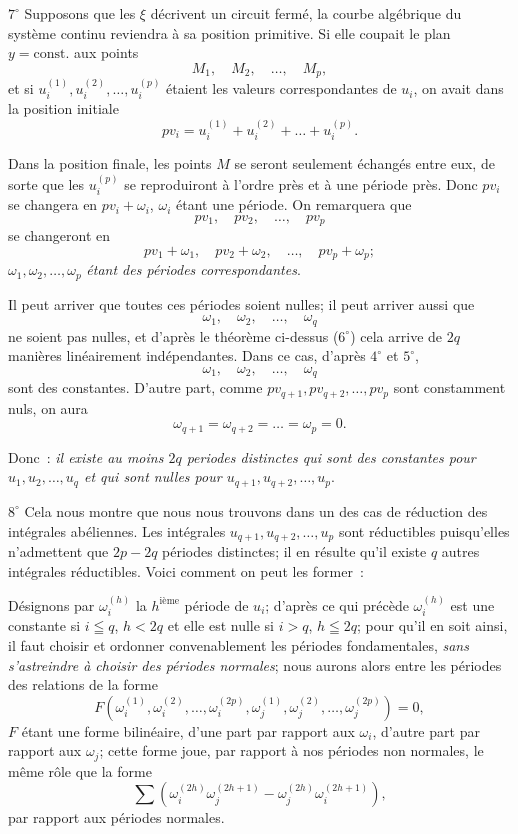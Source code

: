 \documentclass{article}
\begin{document}
$7^\circ$ Supposons que les $\xi$ décrivent un circuit fermé, la courbe algébrique du système continu reviendra à sa position primitive. Si elle coupait le plan $y = \mathrm{const.}$ aux points
\[
M_{1}, \quad M_{2}, \quad \ldots, \quad M_{p},
\]
et si $u_{i}^{(1)}, u_{i}^{(2)}, \ldots, u_{i}^{(p)}$ étaient les valeurs correspondantes de $u_{i}$, on avait dans la position initiale
\[
p v_{i} = u_{i}^{(1)} + u_{i}^{(2)} + \ldots + u_{i}^{(p)}.
\]

Dans la position finale, les points $M$ se seront seulement échangés entre eux, de sorte que les $u_{i}^{(p)}$ se reproduiront à l'ordre près et à une période près. Donc $p v_{i}$ se changera en $p v_{i} + \omega_{i}$, $\omega_{i}$ étant une période. On remarquera que
\[
p v_{1}, \quad p v_{2}, \quad \ldots, \quad p v_{p}
\]
se changeront en
\[
p v_{1} + \omega_{1}, \quad p v_{2} + \omega_{2}, \quad \ldots, \quad p v_{p} + \omega_{p};
\]
$\omega_{1}, \omega_{2}, \ldots, \omega_{p}$ \emph{étant des périodes correspondantes}.

Il peut arriver que toutes ces périodes soient nulles; il peut arriver aussi que
\[
\omega_{1}, \quad \omega_{2}, \quad \ldots, \quad \omega_{q}
\]
ne soient pas nulles, et d'après le théorème ci-dessus ($6^\circ$) cela arrive de $2q$ manières linéairement indépendantes. Dans ce cas, d'après $4^\circ$ et $5^\circ$,
\[
\omega_{1}, \quad \omega_{2}, \quad \ldots, \quad \omega_{q}
\]
sont des constantes. D'autre part, comme $p v_{q+1}, p v_{q+2}, \ldots, p v_{p}$ sont constamment nuls, on aura
\[
\omega_{q+1} = \omega_{q+2} = \ldots = \omega_{p} = 0.
\]

Donc~: \emph{il existe au moins $2q$ periodes distinctes qui sont des constantes pour $u_{1}, u_{2}, \ldots, u_{q}$ et qui sont nulles pour $u_{q+1}, u_{q+2}, \ldots, u_{p}$}.

$8^\circ$ Cela nous montre que nous nous trouvons dans un des cas de réduction des intégrales abéliennes. Les intégrales $u_{q+1}, u_{q+2}, \ldots, u_{p}$ sont réductibles puisqu'elles n'admettent que $2p - 2q$ périodes distinctes; il en résulte qu'il existe $q$ autres intégrales réductibles. Voici comment on peut les former~:

Désignons par $\omega_{i}^{(h)}$ la $h^{\text{ième}}$ période de $u_{i}$; d'après ce qui précède $\omega_{i}^{(h)}$ est une constante si $i \leqq q$, $h < 2q$ et elle est nulle si $i > q$, $h \leqq 2q$; pour qu'il en soit ainsi, il faut choisir et ordonner convenablement les périodes fondamentales, \emph{sans s'astreindre à choisir des périodes normales}; nous aurons alors entre les périodes des relations de la forme
\[
F(\omega_{i}^{(1)}, \omega_{i}^{(2)}, \ldots, \omega_{i}^{(2p)}, \omega_{j}^{(1)}, \omega_{j}^{(2)}, \ldots, \omega_{j}^{(2p)}) = 0,
\]
$F$ étant une forme bilinéaire, d'une part par rapport aux $\omega_{i}$, d'autre part par rapport aux $\omega_{j}$; cette forme joue, par rapport à nos périodes non normales, le même rôle que la forme
\[
\sum (\omega_{i}^{(2h)} \omega_{j}^{(2h+1)} - \omega_{j}^{(2h)} \omega_{i}^{(2h+1)}),
\]
par rapport aux périodes normales.
\end{document}
